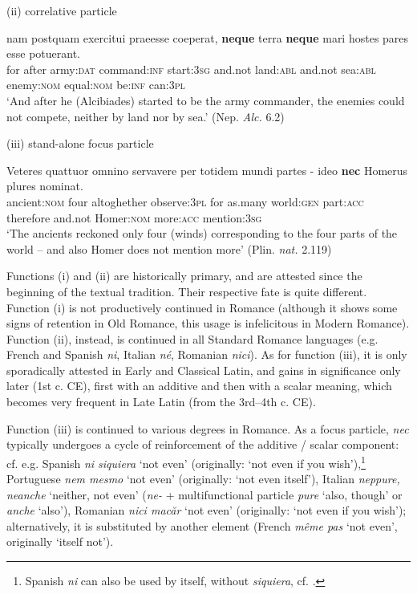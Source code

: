 \documentclass[output=paper,modfonts,nonflat,citecolor=brown,
showindex
]{langsci/langscibook}
\begin{document}
{\begin{exe}
\ex (ii) correlative particle

\label{firstcorrelativenec} \gll nam postquam exercitui praeesse coeperat, {\textbf{neque}} terra {\textbf{neque}} mari hostes pares esse potuerant.\\
for after army:{\textsc{dat}} command:{\textsc{inf}} start:{\textsc{3sg}} and.not land:{\textsc{abl}} and.not sea:{\textsc{abl}} enemy:{\textsc{nom}} equal:{\textsc{nom}} be:{\textsc{inf}} can:{\textsc{3pl}}\\

`And after he (Alcibiades) started to be the army commander, the enemies could not compete, neither by land nor by sea.'
(Nep. {\emph{Alc.}} 6.2)
\end{exe}}

{\begin{exe}
\ex (iii) stand-alone focus particle

\label{firstfocusnec} \gll Veteres quattuor omnino servavere per totidem mundi partes {- ideo} {\textbf{nec}} Homerus plures nominat.\\
ancient:{\textsc{nom}} four altoghether observe:{\textsc{3pl}} for as.many world:{\textsc{gen}} part:{\textsc{acc}} therefore and.not Homer:{\textsc{nom}} more:{\textsc{acc}} mention:{\textsc{3sg}}\\

`The ancients reckoned only four (winds) corresponding to the four parts of the world -- and also Homer does not mention more' (Plin. {\emph{nat.}} 2.119)
\end{exe}}

\noindent Functions (i) and (ii) are historically primary, and are attested since the beginning of the textual tradition. Their respective fate is quite different. Function (i) is not productively continued in Romance (although it shows some signs of retention in Old Romance, this usage is infelicitous in Modern Romance). Function (ii), instead, is continued in all Standard Romance languages (e.g. French and Spanish {\emph{ni}}, Italian {\emph{n\'e}}, Romanian {\emph{nici}}). As for function (iii), it is only sporadically attested in Early and Classical Latin, and gains in significance only later (1st c. CE), first with an additive and then with a scalar meaning, which becomes very frequent in Late Latin (from the 3rd--4th c. CE).

Function (iii) is continued to various degrees in Romance. As a focus particle, {\emph{nec}} typically undergoes a cycle of reinforcement of the additive / scalar component: cf. e.g. Spanish {\emph{ni siquiera}} `not even' (originally: `not even if you wish'),{\footnote{Spanish {\emph{ni}} can also be used by itself, without {\emph{siquiera}}, cf. \citet[]{Aranovich06}.}} Portuguese {\emph{nem mesmo}} `not even' (originally: `not even itself'), Italian {\emph{neppure, neanche}} `neither, not even' ({\emph{ne-}} + multifunctional particle {\emph{pure}} `also, though' or {\emph{anche}} `also'), Romanian {\emph{nici mac\u{a}r}} `not even' (originally: `not even if you wish'); alternatively, it is substituted by another element (French {\emph{m\^eme pas}} `not even', originally `itself not').
\end{document}
